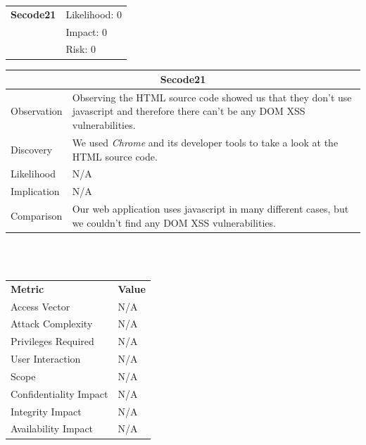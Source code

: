 \documentclass[headsepline,footsepline,footinclude=false,oneside,fontsize=11pt,paper=a4,listof=totoc,bibliography=totoc]{scrbook} %
\begin{document}
\begin{tabular}{cR{12cm}}
	\textbf{Secode21} & Likelihood: 0\\& Impact: 0\\& Risk: 0
\end{tabular}

\begin{tabular}{ l|p{11cm}  }
	\hline
	\multicolumn{2}{c}{\textbf{Secode21}} \\
	\hline
	Observation   & Observing the HTML source code showed us that they don't use javascript and therefore there can't be any DOM XSS vulnerabilities. \\
	Discovery  & We used \textit{Chrome} and its developer tools to take a look at the HTML source code. \\
	Likelihood & N/A \\
	Implication    & N/A \\
	Comparison & Our web application uses javascript in many different cases, but we couldn't find any DOM XSS vulnerabilities. \\
	\hline
\end{tabular}
\\
\vspace{0.5cm}
\\
\begin{center}
	\begin{tabular}{ll}
		\rowcolor[HTML]{34CDF9}
		{\color[HTML]{ECF4FF} \textbf{Metric}}        & {\color[HTML]{ECF4FF} \textbf{Value}} \\
		\rowcolor[HTML]{BBDAFF}
		{\color[HTML]{333333} Access Vector}          & {\color[HTML]{333333} } N/A              \\
		\rowcolor[HTML]{ECF4FF}
		{\color[HTML]{333333} Attack Complexity}      & {\color[HTML]{333333} } N/A              \\
		\rowcolor[HTML]{BBDAFF}
		{\color[HTML]{333333} Privileges Required}    & {\color[HTML]{333333} } N/A              \\
		\rowcolor[HTML]{ECF4FF}
		{\color[HTML]{333333} User Interaction}       & {\color[HTML]{333333} } N/A              \\
		\rowcolor[HTML]{BBDAFF}
		{\color[HTML]{333333} Scope}                  & {\color[HTML]{333333} } N/A              \\
		\rowcolor[HTML]{ECF4FF}
		{\color[HTML]{333333} Confidentiality Impact} & {\color[HTML]{333333} } N/A              \\
		\rowcolor[HTML]{BBDAFF}
		{\color[HTML]{333333} Integrity Impact}       & {\color[HTML]{333333} } N/A              \\
		\rowcolor[HTML]{ECF4FF}
		{\color[HTML]{333333} Availability Impact}    & {\color[HTML]{333333} } N/A
	\end{tabular}
\end{center}
\end{document}
